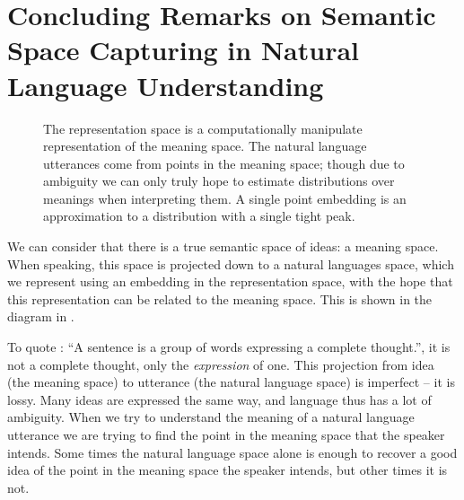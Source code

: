 \documentclass{book}
\begin{document}
\section{Concluding Remarks on Semantic Space Capturing in Natural Language Understanding}
\begin{figure}
	\centering
	\large
	\caption{\label{fig:spaces} The representation space is a computationally manipulate representation of the meaning space.
	The natural language utterances come from points in the meaning space; 
	though due to ambiguity we can only truly hope to estimate distributions over meanings when interpreting them.
	A single point embedding is an approximation to a distribution with a single tight peak.
 }
\end{figure}

We can consider that there is a true semantic space of ideas: a meaning space.
When speaking, this space is projected down to a natural languages space,
which we represent using an embedding in the representation space, with the hope that this representation can be related to the meaning space.
This is shown in the diagram in .

To quote \citet{webster}:  ``A sentence is a group of words expressing a complete thought.'', it is not a complete thought, only the \emph{expression} of one.
This projection from idea (the meaning space) to utterance (the natural language space) is imperfect -- it is lossy.
Many ideas are expressed the same way, and language thus has a lot of ambiguity.
When we try to understand the meaning of a natural language utterance we are trying to find the point in the meaning space that the speaker intends.
Some times the natural language space alone is enough to recover a good idea of the point in the meaning space the speaker intends,
but other times it is not.
\end{document}
